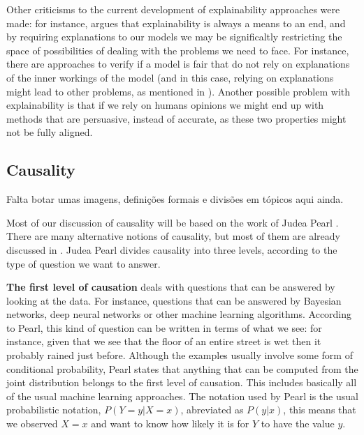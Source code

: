 Other criticisms to the current development of explainability approaches were made: for instance, \cite{krishnan2020against} argues that explainability is always a means to an end, and by requiring explanations to our models we may be significaltly restricting the space of possibilities of dealing with the problems we need to face. For instance, there are approaches to verify if a model is fair that do not rely on explanations of the inner workings of the model (and in this case, relying on explanations might lead to other problems, as mentioned in \cite{ExplainAll}). Another possible problem with explainability is that if we rely on humans opinions we might end up with methods that are persuasive, instead of accurate, as these two properties might not be fully aligned. 

\subsection{Causality}

{\color{red} Falta botar umas imagens, definições formais e divisões em tópicos aqui ainda.}

Most of our discussion of causality will be based on the work of Judea Pearl \cite{Causality}. There are many alternative notions of causality, but most of them are already discussed in \cite{Causality}. Judea Pearl divides causality into three levels, according to the type of question we want to answer. 

\textbf{The first level of causation} deals with questions that can be answered by looking at the data. For instance, questions that can be answered by Bayesian networks, deep neural networks or other machine learning algorithms. According to Pearl, this kind of question can be written in terms of what we see: for instance, given that we see that the floor of an entire street is wet then it probably rained just before. Although the examples usually involve some form of conditional probability, Pearl states that anything that can be computed from the joint distribution belongs to the first level of causation. This includes basically all of the usual machine learning approaches. The notation used by Pearl is the usual probabilistic notation, $P(Y=y|X=x)$, abreviated as $P(y|x)$, this means that we observed $X=x$ and want to know how likely it is for $Y$ to have the value $y$.

